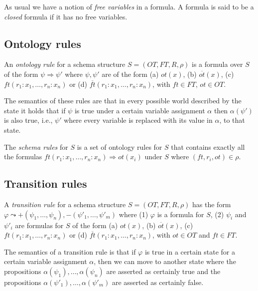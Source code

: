 \documentclass[11pt]{amsart}
\begin{document}
As usual we have a notion of \emph{free variables} in a formula. A formula is said to be a \emph{closed} formula if it has no free variables.


\subsection{Ontology rules} An \emph{ontology rule} for a schema structure $S = (OT, FT, R, \rho)$ is a formula over $S$ of the form  $\psi \Rightarrow \psi'$ where $\psi, \psi'$ are of the form (a) $ot(x)$, (b) $\overline{ot}(x)$, (c) $ft(r_1 : x_1, \ldots, r_n : x_n)$ or (d) $\overline{ft}(r_1 : x_1, \ldots, r_n : x_n)$, with $ft \in FT$, $ot \in {OT}$.

The semantics of these rules are that in every possible world described by the state it holds that if $\psi$ is true under a certain variable assignment $\alpha$ then $\alpha(\psi')$ is also true, i.e., $\psi'$ where every variable is replaced with its value in $\alpha$, to that state.

The \emph{schema rules} for $S$ is a set of ontology rules for $S$ that contains exactly all the formulas $ft(r_1 : x_1, \ldots, r_n : x_n) \Rightarrow ot(x_i)$ under $S$ where $(ft, r_i, ot) \in \rho$.

\subsection{Transition rules} A \emph{transition rule} for a schema structure $S = (OT, FT, R, \rho)$ has the form $\varphi \leadsto +(\psi_1, \ldots, \psi_n), -(\psi'_1, \ldots, \psi'_m)$ where (1) $\varphi$ is a formula for $S$, (2) $\psi_i$ and $\psi'_i$ are formulas for $S$ of the form (a) $ot(x)$, (b) $\overline{ot}(x)$, (c) $ft(r_1:x_1, \ldots, r_n:x_n)$ or (d) $\overline{ft}(r_1:x_1, \ldots, r_n:x_n)$, with $ot \in {OT}$ and $ft \in {FT}$.

The semantics of a transition rule is that if $\varphi$ is true in a certain state for a certain variable assignment $\alpha$, then we can move to another state where the propositions $\alpha(\psi_1), \ldots, \alpha(\psi_n)$ are asserted as certainly true and the propositions $\alpha(\psi'_1), \ldots, \alpha(\psi'_m)$ are asserted as certainly false.
\end{document}
